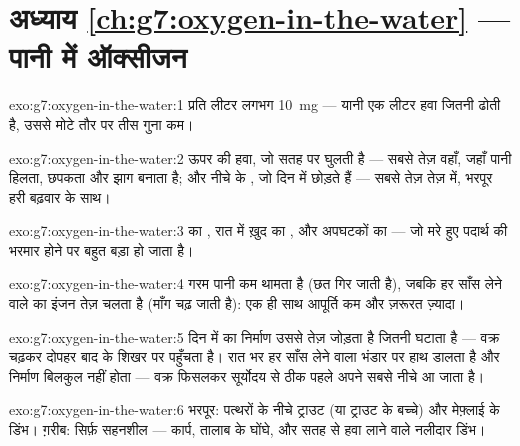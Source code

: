 \section*{अध्याय \ref{ch:g7:oxygen-in-the-water} --- पानी में ऑक्सीजन}

\begin{solution}{exo:g7:oxygen-in-the-water:1}
प्रति लीटर लगभग \qty{10}{mg} --- यानी एक लीटर हवा जितनी ढोती है, उससे
मोटे तौर पर तीस गुना कम।
\end{solution}

\begin{solution}{exo:g7:oxygen-in-the-water:2}
ऊपर की हवा, जो सतह पर घुलती है --- सबसे तेज़ वहाँ, जहाँ पानी हिलता,
छपकता और झाग बनाता है; और नीचे के , जो दिन में  छोड़ते
हैं --- सबसे तेज़ तेज़  में, भरपूर हरी बढ़वार के साथ।
\end{solution}

\begin{solution}{exo:g7:oxygen-in-the-water:3}
 का , रात में ख़ुद  का , और अपघटकों का --- जो मरे
हुए पदार्थ की भरमार होने पर बहुत बड़ा हो जाता है।
\end{solution}

\begin{solution}{exo:g7:oxygen-in-the-water:4}
गरम पानी  कम थामता है (छत गिर जाती है), जबकि हर साँस
लेने वाले का इंजन तेज़ चलता है (माँग चढ़ जाती है): एक ही साथ आपूर्ति कम
और ज़रूरत ज़्यादा।
\end{solution}

\begin{solution}{exo:g7:oxygen-in-the-water:5}
दिन में  का निर्माण  उससे तेज़ जोड़ता है जितनी 
घटाता है --- वक्र चढ़कर दोपहर बाद के शिखर पर पहुँचता है। रात भर हर साँस
लेने वाला भंडार पर हाथ डालता है और निर्माण बिलकुल नहीं होता --- वक्र
फिसलकर सूर्योदय से ठीक पहले अपने सबसे नीचे आ जाता है।
\end{solution}

\begin{solution}{exo:g7:oxygen-in-the-water:6}
भरपूर: पत्थरों के नीचे ट्राउट (या ट्राउट के बच्चे) और मेफ़्लाई के डिंभ।
ग़रीब: सिर्फ़ सहनशील  --- कार्प, तालाब के घोंघे, और सतह से
हवा लाने वाले नलीदार डिंभ।
\end{solution}


